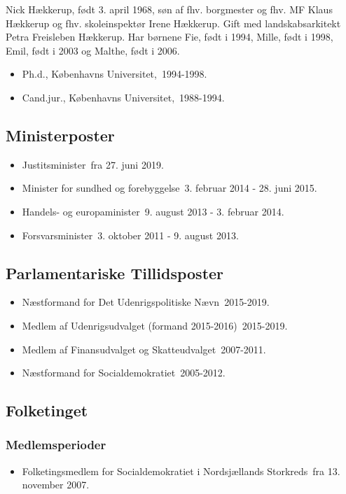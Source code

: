 \documentclass[11pt, a4paper]{awesome-cv}
\begin{document}
\makecvheader[R]
\makelettertitle
\begin{cvletter}
Nick Hækkerup, født 3. april 1968, søn af fhv. borgmester og fhv. MF Klaus Hækkerup og fhv. skoleinspektør Irene Hækkerup. Gift med landskabsarkitekt Petra Freisleben Hækkerup. Har børnene Fie, født i 1994, Mille, født i 1998, Emil, født i 2003 og Malthe, født i 2006.

\begin{itemize}
\item Ph.d., Københavns Universitet, 1994-1998.
\item Cand.jur., Københavns Universitet, 1988-1994.
\end{itemize}
\subsection*{Ministerposter}
\begin{itemize}
\item Justitsminister fra 27. juni 2019.
\item Minister for sundhed og forebyggelse 3. februar 2014 - 28. juni 2015.
\item Handels- og europaminister 9. august 2013 - 3. februar 2014.
\item Forsvarsminister 3. oktober 2011 - 9. august 2013.
\end{itemize}
\subsection*{Parlamentariske Tillidsposter}
\begin{itemize}
\item Næstformand for Det Udenrigspolitiske Nævn 2015-2019.
\item Medlem af Udenrigsudvalget (formand 2015-2016) 2015-2019.
\item Medlem af Finansudvalget og Skatteudvalget 2007-2011.
\item Næstformand for Socialdemokratiet 2005-2012.
\end{itemize}
\subsection*{Folketinget}
\subsubsection*{Medlemsperioder}
\begin{itemize}
\item Folketingsmedlem for Socialdemokratiet i Nordsjællands Storkreds fra 13. november 2007.
\end{itemize}

\end{cvletter}
\end{document}
